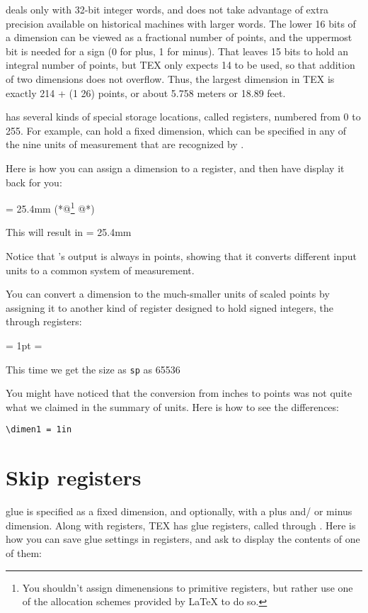 \tex deals only with 32-bit integer words, and does not take advantage
of extra precision available on historical machines with larger words. The
lower 16 bits of a dimension can be viewed as a fractional number of points,
and the uppermost bit is needed for a sign (0 for plus, 1 for minus). That
leaves 15 bits to hold an integral number of points, but TEX only expects 14
to be used, so that addition of two dimensions does not overflow. Thus, the
largest dimension in TEX is exactly 214 + (1 26) points, or about 5.758  
meters or 18.89 feet.

\tex has several kinds of special storage locations, called registers, numbered
from 0 to 255. For example, can hold a fixed dimension,
which can be specified in any of the nine units of measurement that are
recognized by \tex.

Here is how you can assign a dimension to a register, and then have \tex
display it back for you:

\begin{teXXX}
 = 25.4mm (*@\protect\footnote{You shouldn't assign dimenensions to primitive registers, but rather use one of the allocation schemes provided by LaTeX to do so.}  @*)
\the{}
\end{teXXX}

This will result in
 = 25.4mm

\the{}


Notice that \tex’s output is always in points, showing that it converts different
input units to a common system of measurement.

You can convert a dimension to the much-smaller units of scaled points
by assigning it to another kind of \tex register designed to hold signed integers,
the through registers:

\begin{texexample}{}{}
 = 1pt
 = 
\the{}
\end{texexample}

{\noindent This time we get the size as \texttt{sp} as 65536 }


You might have noticed that the conversion from inches to points was not
quite what we claimed in the summary of \tex units. Here is how to see the
differences:

\verb+\dimen1 = 1in+


\section{Skip registers}
\begin{macro}{\skip}
\tex glue is specified as a fixed dimension, and optionally, with a plus and/
or minus dimension. Along with  registers, TEX has glue registers,
called  through . Here is how you can save glue settings in
 registers, and ask \tex to display the contents of one of them:
\end{macro}

